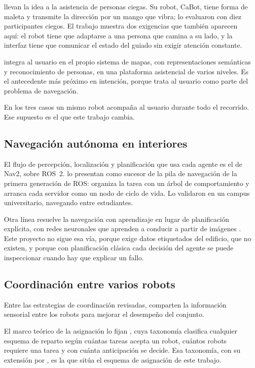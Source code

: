 \textcite{guerreiro2019cabot} llevan la idea a la asistencia de personas ciegas.
Su robot, CaBot, tiene forma de maleta y transmite la dirección por un mango que
vibra; lo evaluaron con diez participantes ciegos. El trabajo muestra dos
exigencias que también aparecen aquí: el robot tiene que adaptarse a una persona
que camina a su lado, y la interfaz tiene que comunicar el estado del guiado sin
exigir atención constante.

\textcite{jimenez2024arquitectura} integra al usuario en el propio sistema de
mapas, con representaciones semánticas y reconocimiento de personas, en una
plataforma asistencial de varios niveles. Es el antecedente más próximo en
intención, porque trata al usuario como parte del problema de navegación.

En los tres casos un mismo robot acompaña al usuario durante todo el recorrido.
Ese supuesto es el que este trabajo cambia.

\subsection{Navegación autónoma en interiores}

El flujo de percepción, localización y planificación que usa cada agente es el de Nav2, sobre ROS~2.
\textcite{macenski2020marathon} lo presentan como sucesor de la pila de
navegación de la primera generación de ROS: organiza la tarea con un árbol de
comportamiento y arranca cada servidor como un nodo de ciclo de vida. Lo validaron en un campus universitario, navegando entre estudiantes.

Otra línea resuelve la navegación con aprendizaje en lugar de planificación explícita, con redes neuronales que aprenden a conducir a partir de imágenes \autocite{bojarski2016end}. Este proyecto no sigue esa vía, porque
exige datos etiquetados del edificio, que no existen, y porque con planificación
clásica cada decisión del agente se puede inspeccionar cuando hay que explicar
un fallo.

\subsection{Coordinación entre varios robots}

Entre las estrategias de coordinación revisadas, \textcite{nair2024collaborative} comparten la información sensorial entre los robots para mejorar el desempeño del conjunto.

El marco teórico de la asignación lo fijan \textcite{gerkey2004taxonomy}, cuya
taxonomía clasifica cualquier esquema de reparto según cuántas tareas acepta un
robot, cuántos robots requiere una tarea y con cuánta anticipación se decide. Esa taxonomía, con su extensión por \textcite{korsah2013comprehensive}, es la que sitúa el esquema de asignación de este trabajo.

